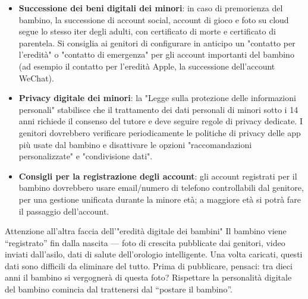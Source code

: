 \begin{itemize}
  \item \textbf{Successione dei beni digitali dei minori}: in caso di premorienza del bambino, la successione di account social, account di gioco e foto su cloud segue lo stesso iter degli adulti, con certificato di morte e certificato di parentela. Si consiglia ai genitori di configurare in anticipo un "contatto per l'eredità" o "contatto di emergenza" per gli account importanti del bambino (ad esempio il contatto per l'eredità Apple, la successione dell'account WeChat).
  \item \textbf{Privacy digitale dei minori}: la "Legge sulla protezione delle informazioni personali" stabilisce che il trattamento dei dati personali di minori sotto i 14 anni richiede il consenso del tutore e deve seguire regole di privacy dedicate. I genitori dovrebbero verificare periodicamente le politiche di privacy delle app più usate dal bambino e disattivare le opzioni "raccomandazioni personalizzate" e "condivisione dati".
  \item \textbf{Consigli per la registrazione degli account}: gli account registrati per il bambino dovrebbero usare email/numero di telefono controllabili dal genitore, per una gestione unificata durante la minore età; a maggiore età si potrà fare il passaggio dell'account.
\end{itemize}

\begin{tcbwarn}{Attenzione all'altra faccia dell'"eredità digitale dei bambini"}
Il bambino viene “registrato” fin dalla nascita — foto di crescita pubblicate dai genitori, video inviati dall'asilo, dati di salute dell'orologio intelligente. Una volta caricati, questi dati sono difficili da eliminare del tutto. Prima di pubblicare, pensaci: tra dieci anni il bambino si vergognerà di questa foto? Rispettare la personalità digitale del bambino comincia dal trattenersi dal “postare il bambino”.

\end{tcbwarn}

